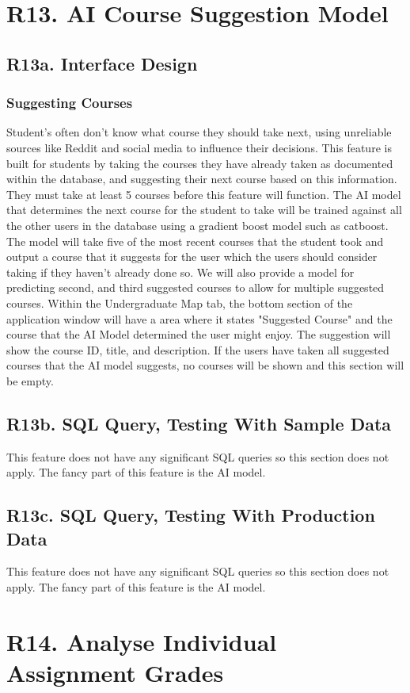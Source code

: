 \documentclass[12pt, a4paper]{article}
\begin{document}
\section*{R13. AI Course Suggestion Model}
\label{sec:R13}
\subsection*{R13a. Interface Design}
\subsubsection*{Suggesting Courses}
Student's often don't know what course they should take next, using unreliable sources like Reddit and social media to influence their decisions. This feature is built for students by taking the courses they have already taken as documented within the database, and suggesting their next course based on this information. They must take at least 5 courses before this feature will function. The AI model that determines the next course for the student to take will be trained against all the other users in the database using a gradient boost model such as catboost. The model will take five of the most recent courses that the student took and output a course that it suggests for the user which the users should consider taking if they haven't already done so. We will also provide a model for predicting second, and third suggested courses to allow for multiple suggested courses. Within the Undergraduate Map tab, the bottom section of the application window will have a area where it states "Suggested Course" and the course that the AI Model determined the user might enjoy. The suggestion will show the course ID, title, and description. If the users have taken all suggested courses that the AI model suggests, no courses will be shown and this section will be empty.
\subsection*{R13b. SQL Query, Testing With Sample Data}
This feature does not have any significant SQL queries so this section does not apply. The fancy part of this feature is the AI model.
\subsection*{R13c. SQL Query, Testing With Production Data}
This feature does not have any significant SQL queries so this section does not apply. The fancy part of this feature is the AI model.
\section*{R14. Analyse Individual Assignment Grades}
\label{sec:R14}
\end{document}
